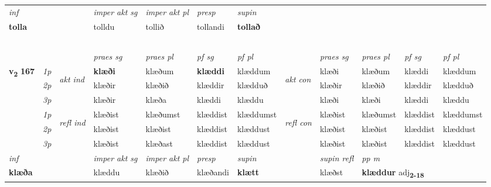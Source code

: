 \begin{longtable}[l]{X>{\footnotesize\itshape}llXXXXlXXXX}
   {\textit{inf}} & &  & \textit{imper akt sg} & \textit{imper akt pl}   & \textit{presp} & \textit{supin}   \\*
  {\textbf{tolla}} & && tolldu  & tollið   & tollandi &  \textbf{tollað}   \\*

\midrule
  & \\*
  & \\*
  & \\*
   & \\*
  & \\
   \midrule
 & &   & \textit{praes sg}  & \textit{praes pl}    & \textit{ pf sg} & \textit{pf pl} & & \textit{praes sg}  & \textit{praes pl}    & \textit{pf sg} & \textit{pf pl }  \\ \cmidrule{4-7} \cmidrule{9-12}
 \multirow{2}{*}{{{\textbf{v{\textsubscript{2}}} \Large{\textbf{167}}}}}  & 1p & \multirow{3}{*}{\begin{turn}{90}\textit{akt ind}\end{turn}} & \textbf{klæði} & klæðum & \textbf{klæddi} & klæddum & \multirow{3}{*}{\begin{turn}{90}\textit{akt con}\end{turn}} &klæði & klæðum & klæddi & klæddum\\*
 & 2p &  &  klæðir  & klæðið & klæddir & klædduð & & klæðir & klæðið & klæddir & klædduð \\*
 & 3p &  & klæðir & klæða & klæddi & klæddu & & klæði & klæði& klæddi & klæddu \\*
\cmidrule{4-7} \cmidrule{9-12}
 & 1p & \multirow{3}{*}{\begin{turn}{90}\textit{refl ind}\end{turn}}  & klæðist & klæðumst & klæddist & klæddumst & \multirow{3}{*}{\begin{turn}{90}\textit{refl con}\end{turn}}  &klæðist & klæðumst & klæddist & klæddumst \\*
 & 2p &  & klæðist & klæðist & klæddist & klæddust & &klæðist & klæðist & klæddist & klæddust \\*
 & 3p  & & klæðist & klæðast & klæddist & klæddust & & klæðist & klæðist& klæddist & klæddust \\*
\cmidrule{4-7} \cmidrule{9-12}

   {\textit{inf}} & &  & \textit{imper akt sg} & \textit{imper akt pl}   & \textit{presp} & \textit{supin} && \textit{supin refl} & \textit{pp m} \\*
  {\textbf{klæða}} & && klæddu  & klæðið   & klæðandi &  \textbf{klætt} && klæðst & \multicolumn{2}{l}{\textbf{klæddur} adj\textbf{\textsubscript{2-18}}} \\*


\end{longtable}
